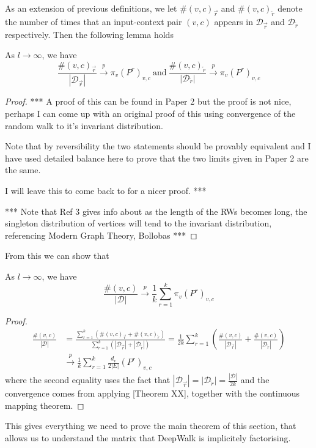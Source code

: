 \documentclass[a4paper]{article}
\newcommand{\D}{\mathcal D}
\newcommand{\rar}{\overrightarrow r}
\newcommand{\lar}{\overleftarrow r}
\begin{document}
As an extension of previous definitions, we let $\#(v, c)_{\rar}$ and $\#(v,
c)_{\lar}$ denote the number of times that an input-context pair $(v,c)$ appears
in $\D_{\rar}$ and $\D_{\lar}$ respectively. Then the following lemma holds
\begin{lemma}
  As $l \to \infty$, we have
  \[\frac{\#(v, c)_{\rar}}{|\D_{\rar}|} \overset{p}{\to} \pi_v(P^r)_{v,c} \  \text{and}
    \ \frac{\#(v, c)_{\lar}}{|\D_{\lar}|} \overset{p}{\to} \pi_v(P^r)_{v,c} \]
\end{lemma}
\begin{proof}
  ***
  A proof of this can be found in Paper 2 but the proof is not nice, perhaps I can
  come up with an original proof of this using convergence of the random walk to
  it's invariant distribution.

  Note that by reversibility the two statements should be provably equivalent and
  I have used detailed balance here to prove that the two limits given in Paper 2
  are the same.

  I will leave this to come back to for a nicer proof.
  ***


  *** Note that Ref 3 gives info about as the length of the RWs becomes long, the
  singleton distribution of vertices will tend to the invariant distribution,
  referencing Modern Graph Theory, Bollobas ***
\end{proof}
From this we can show that
\begin{lemma}
  As $l \to \infty$, we have
  \[\frac{\#(v, c)}{|\D|} \overset{p}{\to} \frac{1}{k} \sum_{r = 1}^k \pi_v
    (P^r)_{v,c}\]
\end{lemma}
\begin{proof}
  \begin{align*}
    \frac{\#(v, c)}{|\D|} &=  \frac{\sum_{r=1}^k (\#(v, c)_{\rar} + \#(v, c)_{\lar})}{\sum_{r=1}^k (|\D_{\rar}| + |\D_{\lar}|)} = \frac{1}{2k} \sum_{r=1}^k \left( \frac{\#(v, c)}{|\D_{\rar}|} + \frac{\#(v, c)}{|\D_{\lar}|} \right)\\
                          &\overset{p}{\to} \frac{1}{k}\sum_{r=1}^{k} \frac{d_v}{2|E|}(P^r)_{v, c}
  \end{align*}
  where the second equality uses the fact that $|\D_{\rar}| = |\D_{\lar}| =
  \frac{|\D|}{2k}$ and the convergence comes from applying [Theorem XX],
  together with the continuous mapping theorem.
\end{proof}
This gives everything we need to prove the main theorem of this section, that
allows us to understand the matrix that DeepWalk is implicitely factorising.
\end{document}
